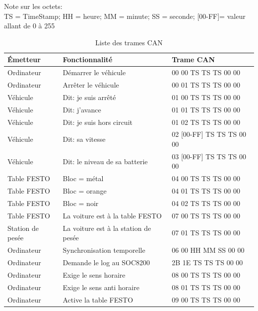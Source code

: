 \documentclass[10pt,a4paper,final]{article}
\begin{document}
\begin{spacing}{1.5}
\begin{center}
Note sur les octets:\\
TS = TimeStamp; HH = heure; MM = minute; SS = seconde; [00-FF]= valeur allant de 0 à 255
\end{center}


\begin{table}[!ht]
\caption{Liste des trames CAN}
\medskip
\centering
\begin{tabular}{|l|l|l|}
\hline 
\textbf{Émetteur} & \textbf{Fonctionnalité} & \textbf{Trame CAN}  \\ 
\hline 
Ordinateur & Démarrer le véhicule & 00 00 TS TS TS 00 00  \\ 
\hline 
Ordinateur & Arrêter le véhicule & 00 01 TS TS TS 00 00  \\ 
\hline 
Véhicule & Dit: je suis arrêté & 01 00 TS TS TS 00 00  \\ 
\hline 
Véhicule & Dit: j'avance & 01 01 TS TS TS 00 00 \\ 
\hline 
Véhicule & Dit: je suis hors circuit & 01 02 TS TS TS 00 00  \\ 
\hline 
Véhicule & Dit: sa vitesse & 02 [00-FF] TS TS TS 00 00 \\ 
\hline 
Véhicule & Dit: le niveau de sa batterie & 03 [00-FF] TS TS TS 00 00 \\ 
\hline 
Table FESTO & Bloc = métal & 04 00 TS TS TS 00 00  \\ 
\hline 
Table FESTO & Bloc = orange & 04 01 TS TS TS 00 00  \\ 
\hline 
Table FESTO & Bloc = noir & 04 02 TS TS TS 00 00  \\ 
\hline 
Table FESTO & La voiture est à la table FESTO & 07 00 TS TS TS 00 00 \\ 
\hline 
Station de pesée & La voiture est à la station de pesée & 07 01 TS TS TS 00 00  \\ 
\hline 
Ordinateur & Synchronisation temporelle & 06 00 HH MM SS 00 00  \\ 
\hline 
Ordinateur & Demande le log au SOC8200 & 2B 1E TS TS TS 00 00  \\ 
\hline 
Ordinateur & Exige le sens horaire & 08 00 TS TS TS 00 00  \\ 
\hline 
Ordinateur & Exige le sens anti horaire & 08 01 TS TS TS 00 00  \\ 
\hline 
Ordinateur & Active la table FESTO & 09 00 TS TS TS 00 00  \\ 
\hline 
\end{tabular} 
\label{tab:testtab2}
\end{table} 


\end{spacing}
\end{document}
